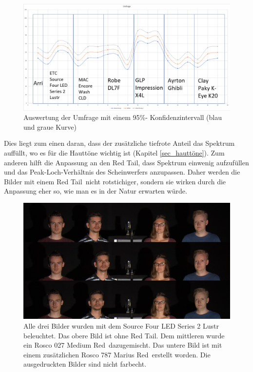 \begin{figure}[H]     %
\centering
\includegraphics[width=1.0\textwidth]{bilder/umfragetab} 
\caption {Auswertung der Umfrage mit einem 95\%- Konfidenzintervall (blau und graue Kurve)}\label{b_umfragetab}
\end{figure}

Dies liegt zum einen daran, dass der zusätzliche tiefrote Anteil das Spektrum auffüllt, wo es für die Hauttöne wichtig ist (Kapitel \ref{sec_hauttöne}).
Zum anderen hilft die Anpassung an den \glqq Red Tail\grqq , dass Spektrum einwenig aufzufüllen und das Peak-Loch-Verhältnis des Scheinwerfers anzupassen. Daher werden die Bilder mit einem \glqq Red Tail\grqq\ nicht rotstichiger, sondern sie wirken durch die Anpassung eher so, wie man es in der Natur erwarten würde.

\begin{figure}[H]     %
\centering
\includegraphics[width=1.0\textwidth]{bilder/vergleich} 
\caption {Alle drei Bilder wurden mit dem Source Four LED Series 2 Lustr beleuchtet. Das obere Bild ist ohne \glqq Red Tail\grqq . Dem mittleren wurde ein Rosco 027 \glqq Medium Red\grqq\ dazugemischt. Das untere Bild ist mit einem zusätzlichen Rosco 787 \glqq Marius Red\grqq\ erstellt worden. Die ausgedruckten Bilder sind nicht farbecht.} \label{b_vergleich}
\end{figure}

